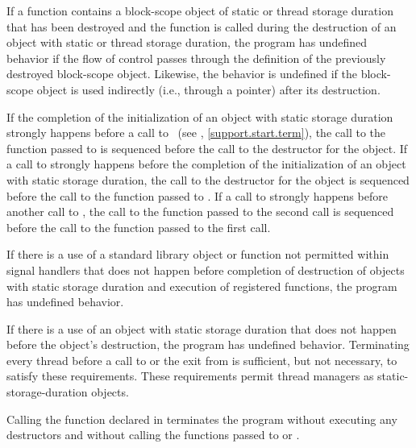 \pnum
If a function contains a block-scope object of static or thread storage duration that has been
destroyed and the function is called during the destruction of an object with static or
thread storage duration, the program has undefined behavior if the flow of control
passes through the definition of the previously destroyed block-scope object. Likewise, the
behavior is undefined if the block-scope object is used indirectly (i.e., through a
pointer) after its destruction.

\pnum
{}%
%
If the completion of the initialization of an object with static storage
duration strongly happens before a call to ~(see
, \ref{support.start.term}), the call to the function passed to
 is sequenced before the call to the destructor for the object. If a
call to  strongly happens before the completion of the initialization of
an object with static storage duration, the call to the destructor for the
object is sequenced before the call to the function passed to . If a
call to  strongly happens before another call to , the
call to the function passed to the second  call is sequenced before
the call to the function passed to the first  call.

\pnum
If there is a use of a standard library object or function not permitted within signal
handlers that does not happen before
completion of destruction of objects with static storage duration and execution of
 registered functions, the program has
undefined behavior.
\begin{note}
If there is a use of an object with static storage
duration that does not happen before the object's destruction, the program has undefined
behavior. Terminating every thread before a call to  or the exit from
 is sufficient, but not necessary, to satisfy these requirements. These
requirements permit thread managers as static-storage-duration objects.
\end{note}

\pnum
{}%
%
%
Calling the function  declared in
 terminates the program without executing any destructors
and without calling
the functions passed to  or .%
